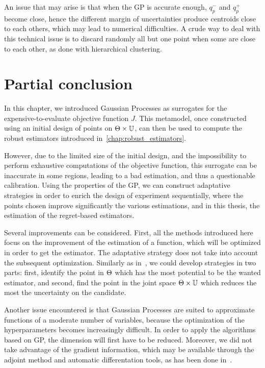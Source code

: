 \documentclass[../../Main_ManuscritThese.tex]{subfiles}
\begin{document}
An issue that may arise is that when the GP is accurate enough, $q_p^-$ and $q_p^+$ become close, hence the different margin of uncertainties produce centroids close to each others, which may lead to numerical difficulties. A crude way to deal with this technical issue is to discard randomly all but one point when some are close to each other, as done with hierarchical clustering.

\section{Partial conclusion}

In this chapter, we introduced Gaussian Processes as surrogates for the expensive-to-evaluate objective function $J$. This metamodel, once constructed using an initial design of points on $\Theta \times \mathbb{U}$, can then be used to compute the robust estimators introduced in~\cref{chap:robust_estimators}.

However, due to the limited size of the initial design, and the impossibility to perform exhaustive computations of the objective function, this surrogate can be inaccurate in some regions, leading to a bad estimation, and thus a questionable calibration.
Using the properties of the GP, we can construct adaptative strategies in order to enrich the design of experiment sequentially, where the points chosen improve significantly the various estimations, and in this thesis, the estimation of the regret-based estimators.

Several improvements can be considered. First, all the methods introduced here focus on the improvement of the estimation of a function, which will be optimized in order to get the estimator. The adaptative strategy does not take into account the subsequent optimization. Similarly as in~\cite{janusevskis_simultaneous_2010}, we could develop strategies in two parts: first, identify the point in $\Theta$ which has the most potential to be the wanted estimator, and second, find the point in the joint space $\Theta \times \mathbb{U}$ which reduces the most the uncertainty on the candidate.

Another issue encountered is that Gaussian Processes are suited to approximate functions of a moderate number of variables, because the optimization of the hyperparameters becomes increasingly difficult. In order to apply the algorithms based on GP, the dimension will first have to be reduced. Moreover, we did not take advantage of the gradient information, which may be available through the adjoint method and automatic differentation tools, as has been done in~\cite{bouhlel_gradient-enhanced_2019,laurent_overview_2019,miranda_adjoint-based_2016,pardalos_differentiating_2015}.
\end{document}
